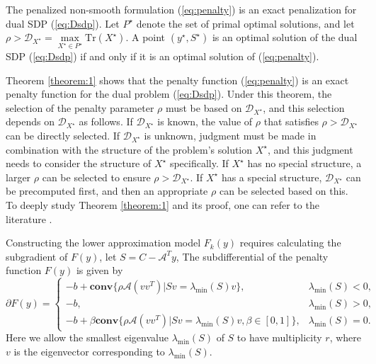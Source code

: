 \documentclass{jcmlatex}
\begin{document}
\begin{theorem}\label{theorem:1}
The penalized non-smooth formulation (\ref{eq:penalty}) is an exact penalization for dual SDP (\ref{eq:Dsdp}). Let \(P^{\star}\) denote the set of primal optimal solutions, and let \(\rho > \mathcal{D}_{X^{\star}} = \max\limits_{X^{\star} \in P^{\star}} \text{Tr}(X^{\star})\). A point \((y^{\star}, S^{\star})\) is an optimal solution of the dual SDP (\ref{eq:Dsdp}) if and only if it is an optimal solution of (\ref{eq:penalty}).
\end{theorem}
Theorem \ref{theorem:1} shows that the penalty function (\ref{eq:penalty}) is an exact penalty function for the dual problem (\ref{eq:Dsdp}). Under this theorem, the selection of the penalty parameter \(\rho\) must be based on \(\mathcal{D}_{X^{\star}}\), and this selection depends on \(\mathcal{D}_{X^{\star}}\) as follows. If \(\mathcal{D}_{X^{\star}}\) is known, the value of \(\rho\) that satisfies \(\rho > \mathcal{D}_{X^{\star}}\) can be directly selected. If \(\mathcal{D}_{X^{\star}}\) is unknown, judgment must be made in combination with the structure of the problem's solution \(X^{\star}\), and this judgment needs to consider the structure of \(X^{\star}\) specifically. If \(X^{\star}\) has no special structure, a larger \(\rho\) can be selected to ensure \(\rho > \mathcal{D}_{X^{\star}}\). If \(X^{\star}\) has a special structure, \(\mathcal{D}_{X^{\star}}\) can be precomputed first, and then an appropriate \(\rho\) can be selected based on this. To deeply study Theorem \ref{theorem:1} and its proof, one can refer to the literature \cite{ding2023revisiting}.

Constructing the lower approximation model \( F_{k}(y) \) requires calculating the subgradient of \( F(y) \), let \(S = C-\mathcal{A}^{T}y\), The subdifferential of the penalty function \(F(y)\)\cite{ding2021optimal} is given by
\begin{equation*}
\partial F(y)=
\begin{cases} 
-b+\textbf{conv}\{\rho\mathcal{A}(vv^{T})|Sv=\lambda_{\min}(S)v\}, &\lambda_{\min}(S)< 0, \\
-b,       & \lambda_{\min}(S)> 0, \\
-b+\beta\textbf{conv}\{\rho\mathcal{A}(vv^{T})|Sv=\lambda_{\min}(S)v,\beta\in[0,1]\}, & \lambda_{\min}(S)= 0.
\end{cases}
\end{equation*}
Here we allow the smallest eigenvalue \(\lambda_{\min}(S)\) of \(S\) to have multiplicity \( r\), where \(v\) is the eigenvector corresponding to \(\lambda_{\min}(S)\). 
\end{document}
